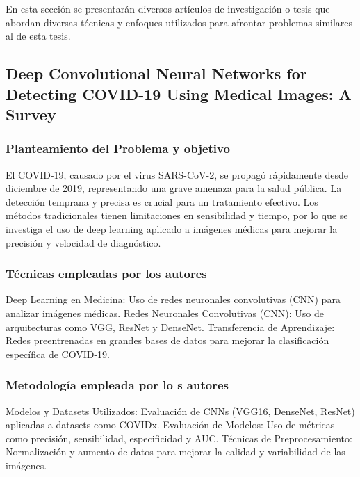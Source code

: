 En esta sección se presentarán diversos artículos de investigación o tesis que abordan diversas técnicas y enfoques utilizados para afrontar problemas similares al de esta tesis.

\subsection{Deep Convolutional Neural Networks for Detecting COVID-19 Using Medical Images: A Survey} %

\subsubsection{Planteamiento del Problema y objetivo }

El COVID-19, causado por el virus SARS-CoV-2, se propagó rápidamente desde diciembre de 2019, representando una grave amenaza para la salud pública. La detección temprana y precisa es crucial para un tratamiento efectivo. Los métodos tradicionales tienen limitaciones en sensibilidad y tiempo, por lo que se investiga el uso de deep learning aplicado a imágenes médicas para mejorar la precisión y velocidad de diagnóstico.

\subsubsection{Técnicas empleadas por los autores}

Deep Learning en Medicina: Uso de redes neuronales convolutivas (CNN) para analizar imágenes médicas.
Redes Neuronales Convolutivas (CNN): Uso de arquitecturas como VGG, ResNet y DenseNet.
Transferencia de Aprendizaje: Redes preentrenadas en grandes bases de datos para mejorar la clasificación específica de COVID-19.

\subsubsection{Metodología empleada por lo	s autores}

Modelos y Datasets Utilizados: Evaluación de CNNs (VGG16, DenseNet, ResNet) aplicadas a datasets como COVIDx.
Evaluación de Modelos: Uso de métricas como precisión, sensibilidad, especificidad y AUC.
Técnicas de Preprocesamiento: Normalización y aumento de datos para mejorar la calidad y variabilidad de las imágenes.

